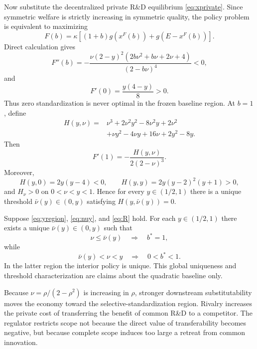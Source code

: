 Now substitute the decentralized private R\&D equilibrium \eqref{eq:xprivate}. Since symmetric welfare is strictly increasing in symmetric quality, the policy problem is equivalent to maximizing
\begin{equation}
 F(b)=\kappa\left[(1+b)g(x^F(b))+g(E-x^F(b))\right].
 \label{eq:F}
\end{equation}
Direct calculation gives
\begin{equation}
 F''(b)=
 -\frac{\nu(2-y)^2(2b\nu^2+b\nu+2\nu+4)}{(2-b\nu)^4}<0,
 \label{eq:Fpp}
\end{equation}
and
\begin{equation}
 F'(0)=\frac{y(4-y)}{8}>0.
 \label{eq:Fp0}
\end{equation}
Thus zero standardization is never optimal in the frozen baseline region. At $b=1$, define
\begin{align}
 H(y,\nu)={}&\nu^3+2\nu^2y^2-8\nu^2y+2\nu^2 \\
 &+\nu y^2-4\nu y+16\nu+2y^2-8y.
 \label{eq:H}
\end{align}
Then
\begin{equation}
 F'(1)=-\frac{H(y,\nu)}{2(2-\nu)^3}.
 \label{eq:Fp1}
\end{equation}
Moreover,
\begin{equation}
 H(y,0)=2y(y-4)<0,
 \qquad
 H(y,y)=2y(y-2)^2(y+1)>0,
\end{equation}
and $H_\nu>0$ on $0<\nu<y<1$. Hence for every $y\in(1/2,1)$ there is a unique threshold $\bar\nu(y)\in(0,y)$ satisfying $H(y,\bar\nu(y))=0$.

\begin{proposition}\label{prop:selective}
Suppose \eqref{eq:yregion}, \eqref{eq:nuy}, and \eqref{eq:R} hold. For each $y\in(1/2,1)$ there exists a unique $\bar\nu(y)\in(0,y)$ such that
\begin{equation}
 \nu\leq\bar\nu(y) \quad\Longrightarrow\quad b^*=1,
\end{equation}
while
\begin{equation}
 \bar\nu(y)<\nu<y \quad\Longrightarrow\quad 0<b^*<1.
\end{equation}
In the latter region the interior policy is unique. This global uniqueness and threshold characterization are claims about the quadratic baseline only.
\end{proposition}

Because $\nu=\rho/(2-\rho^2)$ is increasing in $\rho$, stronger downstream substitutability moves the economy toward the selective-standardization region. Rivalry increases the private cost of transferring the benefit of common R\&D to a competitor. The regulator restricts scope not because the direct value of transferability becomes negative, but because complete scope induces too large a retreat from common innovation.

